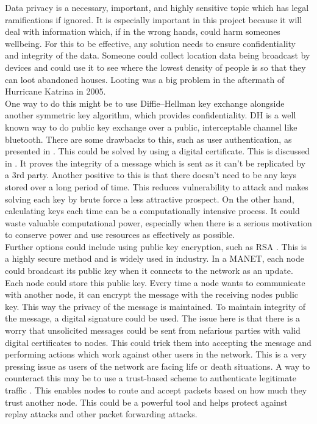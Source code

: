 \documentclass{report}
\begin{document}
Data privacy is a necessary, important, and highly sensitive topic which has legal ramifications if ignored\cite{bbcData}. It is especially important in this project because it will 
deal with information which, if in the wrong hands, could harm someones wellbeing. For this to be effective, any solution needs to ensure confidentiality and integrity of the data.
Someone could collect location data being broadcast by devices and could use it to see where the lowest density of people is so that they can loot abandoned houses. Looting was a big problem 
in the aftermath of Hurricane Katrina in 2005\cite{nbcKatrina}.
\bigskip\\
One way to do this might be to use Diffie--Hellman key exchange\cite{li2010research, diffie1976new} alongside another symmetric key algorithm, which provides confidentiality. DH is a well known way to do public key exchange over 
a public, interceptable channel like bluetooth. There are some drawbacks to this, such as user authentication, as presented in \cite{li2010research}. This could be solved by using a digital 
certificate. This is discussed in \cite{diffie1976new}. It proves the integrity of a message which is sent as it can't be replicated by a 3rd party. 
Another positive to this is that there doesn't need to be any keys stored over a long period of time. This reduces vulnerability to attack and makes solving 
each key by brute force a less attractive prospect. On the other hand, calculating keys each time can be a computationally intensive process. It could waste valuable 
computational power, especially when there is a serious motivation to conserve power and use resources as effectively as possible. 
\bigskip\\
Further options could include using public key encryption, such as RSA \cite{aufa2018security}. This is a highly secure method and is widely used in industry. In a MANET, each node could 
broadcast its public key when it connects to the network as an update. Each node could store this public key. Every time a node wants to communicate with another node, it can 
encrypt the message with the receiving nodes public key. This way the privacy of the message is maintained. To maintain integrity of the message, a digital signature could be 
used. The issue here is that there is a worry that unsolicited messages could be sent from nefarious parties with valid digital certificates to nodes. This could trick them 
into accepting the message and performing actions which work against other users in the network. This is a very pressing issue as users of the network are facing life or 
death situations. A way to counteract this may be to use a trust-based scheme to authenticate legitimate traffic \cite{shah2016trust}. This 
enables nodes to route and accept packets based on how much they trust another node. This could be a powerful tool and helps protect against replay attacks and other 
packet forwarding attacks.
\end{document}
